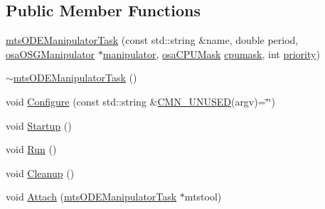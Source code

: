 \subsection*{Public Member Functions}
\begin{DoxyCompactItemize}
\item 
\hyperlink{classmts_o_d_e_manipulator_task_a96f32aa849ef22dda77166d79d7b0839}{mts\+O\+D\+E\+Manipulator\+Task} (const std\+::string \&name, double period, \hyperlink{classosa_o_s_g_manipulator}{osa\+O\+S\+G\+Manipulator} $\ast$\hyperlink{classmts_o_d_e_manipulator_task_af71c105f986e50bd23dd3a385bbf73d4}{manipulator}, \hyperlink{osa_c_p_u_affinity_8h_aaec7cdd7797e5e6eb5438c15fee5477a}{osa\+C\+P\+U\+Mask} \hyperlink{classmts_o_d_e_manipulator_task_aaff55dbeff38e947707c6b3405041622}{cpumask}, int \hyperlink{classmts_o_d_e_manipulator_task_ae2b16e466e4d216b2cf13ae89414696a}{priority})
\item 
\hyperlink{classmts_o_d_e_manipulator_task_a11cb81c6e94f83da977fe3c6715049ff}{$\sim$mts\+O\+D\+E\+Manipulator\+Task} ()
\item 
void \hyperlink{classmts_o_d_e_manipulator_task_a2860f6f53f1cf2383271b07ce1d9e627}{Configure} (const std\+::string \&\hyperlink{cmn_portability_8h_a021894e2626935fa2305434b1e893ff6}{C\+M\+N\+\_\+\+U\+N\+U\+S\+E\+D}(argv)=\char`\"{}\char`\"{})
\item 
void \hyperlink{classmts_o_d_e_manipulator_task_a005684eaa7c679b2798fb8b9e5d35514}{Startup} ()
\item 
void \hyperlink{classmts_o_d_e_manipulator_task_a4dd0bebf8a9287051fe198aa4e42b631}{Run} ()
\item 
void \hyperlink{classmts_o_d_e_manipulator_task_a143d7e3befbbce4a797d6f5cf12f3fca}{Cleanup} ()
\item 
void \hyperlink{classmts_o_d_e_manipulator_task_a3dbff6444a5b8299376e9db6ee4043bc}{Attach} (\hyperlink{classmts_o_d_e_manipulator_task}{mts\+O\+D\+E\+Manipulator\+Task} $\ast$mtstool)
\end{DoxyCompactItemize}
